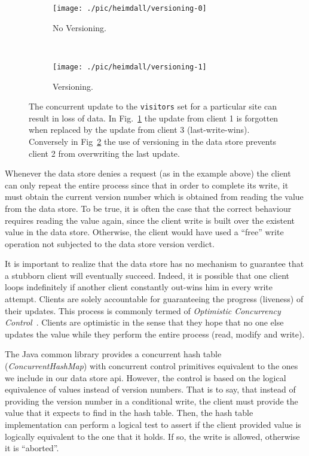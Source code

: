\begin{figure}[ht]
  \centering
  \begin{subfigure}[b]{0.5\textwidth}
                \centering
                \texttt{[image: ./pic/heimdall/versioning-0]}
                \caption{No Versioning.} 
                \label{fig:heimdall:versioning-0}
        \end{subfigure}%
        ~
        \begin{subfigure}[b]{0.5\textwidth}
                \centering
                \texttt{[image: ./pic/heimdall/versioning-1]}
                \caption{Versioning.}
                \label{fig:heimdall:versioning-1}
        \end{subfigure}
  \caption[Concurrent updates]{The concurrent update to the \texttt{visitors} set for a particular site can result in loss of data. In  Fig.~\ref{fig:heimdall:versioning-0} the update from client 1 is forgotten  when replaced by the update from client 3 (last-write-wins).  Conversely in Fig~\ref{fig:heimdall:versioning-1} the use of versioning in the data store prevents client 2 from overwriting the last update.}
\label{fig:heimdall:versioning}
\end{figure}


Whenever the data store denies a request (as in the example above) the client can only repeat the entire process since that in order to complete its write, it must obtain the current version number which is obtained from reading the value from the data store. 
To be true, it is often the case that the correct behaviour requires reading the value again, since the client write is built over the existent value in the data store. 
Otherwise, the client would have used a ``free'' write operation not subjected to the data store version verdict. 


It is important to realize that the data store has no mechanism to guarantee that a stubborn client will eventually succeed.
Indeed, it is possible that one client  loops indefinitely if another client constantly out-wins him in every write attempt. 
Clients are solely accountable for  guaranteeing  the progress (liveness) of their updates. 
This process is commonly termed of \emph{Optimistic Concurrency Control}~\cite{kung1981optimistic}. Clients are optimistic in the sense that they hope that no one else updates the value while they perform the entire process (read, modify and write). 

The Java common library provides a concurrent hash table (\emph{ConcurrentHashMap}) with concurrent control primitives  equivalent to the ones we include in our data store \gls{api}. 
However, the control is based on the logical equivalence of values instead of version numbers. 
That is to say, that instead of providing the version number in a conditional write, the client must provide the value that it expects to find in the hash table. 
Then, the hash table implementation can perform a logical test to assert if the client provided value is logically equivalent to the one that it holds. If so, the write is allowed, otherwise it is ``aborted''.  

